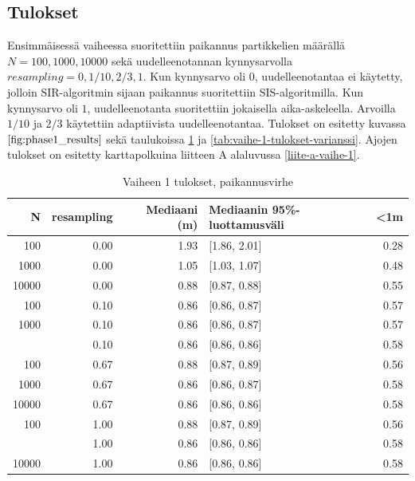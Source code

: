\documentclass[
  12pt,
  a4paper, twoside]{book}
\begin{document}
\hypertarget{tulokset}{%
\subsection{Tulokset}\label{tulokset}}

Ensimmäisessä vaiheessa suoritettiin paikannus partikkelien määrällä \(N={100,1000,10000}\) sekä uudelleenotannan kynnysarvolla \(resampling={0,1/10,2/3,1}\). Kun kynnysarvo oli \(0\), uudelleenotantaa ei käytetty, jolloin SIR-algoritmin sijaan paikannus suoritettiin SIS-algoritmilla. Kun kynnysarvo oli \(1\), uudelleenotanta suoritettiin jokaisella aika-askeleella. Arvoilla \(1/10\) ja \(2/3\) käytettiin adaptiivista uudelleenotantaa. Tulokset on esitetty kuvassa \(\ref{fig:phase1_results}\) sekä taulukoissa \ref{tab:vaihe-1-tulokset} ja \ref{tab:vaihe-1-tulokset-varianssi}. Ajojen tulokset on esitetty karttapolkuina liitteen A alaluvussa \ref{liite-a-vaihe-1}.

\begin{table}

\caption{\label{tab:vaihe-1-tulokset}Vaiheen 1 tulokset, paikannusvirhe}
\centering
\begin{tabular}[t]{rrrlr}
\toprule
N & resampling & Mediaani (m) & Mediaanin 95\%-luottamusväli & <1m\\
\midrule
100 & 0.00 & 1.93 & {}[1.86, 2.01] & 0.28\\
1000 & 0.00 & 1.05 & {}[1.03, 1.07] & 0.48\\
10000 & 0.00 & 0.88 & {}[0.87, 0.88] & 0.55\\
100 & 0.10 & 0.86 & {}[0.86, 0.87] & 0.57\\
1000 & 0.10 & 0.86 & {}[0.86, 0.87] & 0.57\\
\addlinespace
10000 & 0.10 & 0.86 & {}[0.86, 0.86] & 0.58\\
100 & 0.67 & 0.88 & {}[0.87, 0.89] & 0.56\\
1000 & 0.67 & 0.86 & {}[0.86, 0.87] & 0.58\\
10000 & 0.67 & 0.86 & {}[0.86, 0.86] & 0.58\\
100 & 1.00 & 0.88 & {}[0.87, 0.89] & 0.56\\
\addlinespace
1000 & 1.00 & 0.86 & {}[0.86, 0.86] & 0.58\\
10000 & 1.00 & 0.86 & {}[0.86, 0.86] & 0.58\\
\bottomrule
\end{tabular}
\end{table}
\end{document}

